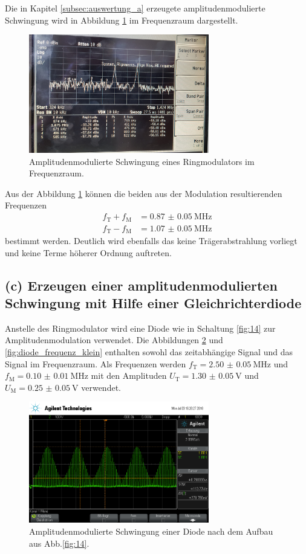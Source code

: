 Die in Kapitel \ref{subsec:auswertung_a} erzeugete
amplitudenmodulierte Schwingung wird in Abbildung \ref{fig:ringamp_frequenz}
im Frequenzraum dargestellt.
\begin{figure}
  \centering
  \includegraphics[width=0.7\textwidth]{spec/frequenzbereich_klein_ring.jpg}
  \caption{Amplitudenmodulierte
  Schwingung eines Ringmodulators im Frequenzraum.}
  \label{fig:ringamp_frequenz}
\end{figure}
Aus der Abbildung \ref{fig:ringamp_frequenz}
können die beiden aus der Modulation resultierenden Frequenzen
\begin{align}
  f_{\text{T}}+f_{\text{M}}&=\SI{0.87(5)}{\mega\hertz} \\
  f_{\text{T}}-f_{\text{M}}&=\SI{1.07(5)}{\mega\hertz}
\end{align}
bestimmt werden.
Deutlich wird ebenfalls das keine Trägerabstrahlung vorliegt und
keine Terme höherer Ordnung auftreten.

\FloatBarrier
\subsection{(c) Erzeugen einer amplitudenmodulierten Schwingung
mit Hilfe einer Gleichrichterdiode}
\label{subsec:auswertung_c}
Anstelle des Ringmodulator wird eine Diode wie in Schaltung \ref{fig:14} zur Amplitudenmodulation verwendet.
Die Abbildungen \ref{fig:diode_zeit} und \ref{fig:diode_frequenz_klein}
enthalten
sowohl das zeitabhängige Signal und das Signal im Frequenzraum.
Als Frequenzen werden $f_{\text{T}}=\SI{2.50(5)}{\mega\hertz}$ und
$f_{\text{M}}=\SI{0.10(1)}{\mega\hertz}$ mit den Amplituden
$U_{\text{T}}=\SI{1.30(5)}{\volt}$ und
$U_{\text{M}}=\SI{0.25(5)}{\volt}$
verwendet.

\begin{figure}
  \centering
  \includegraphics[width=0.7\textwidth]{osci/amp_mod_diode.png}
  \caption{Amplitudenmodulierte
  Schwingung einer Diode nach dem Aufbau aus Abb.\ref{fig:14}.}
  \label{fig:diode_zeit}
\end{figure}

